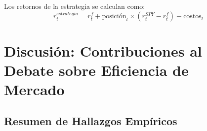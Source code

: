 \documentclass[11pt,a4paper]{article}
\begin{document}
Los retornos de la estrategia se calculan como:
\begin{equation}
r_t^{estrategia} = r_t^f + \text{posici\'on}_t \times (r_t^{SPY} - r_t^f) - \text{costos}_t
\end{equation}













\section{Discusi\'on: Contribuciones al Debate sobre Eficiencia de Mercado}

\subsection{Resumen de Hallazgos Emp\'iricos}
\end{document}
